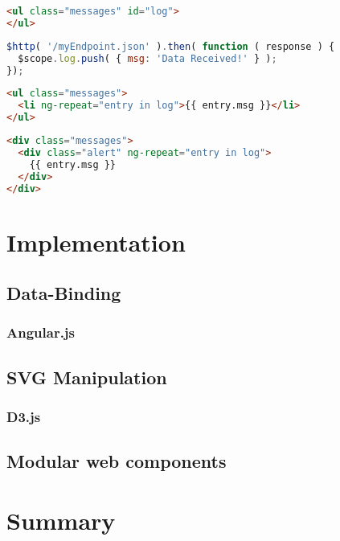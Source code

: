 \begin{lstlisting}[language=html]
<ul class="messages" id="log">
</ul>
\end{lstlisting}

\begin{lstlisting}[language=JavaScript]
$http( '/myEndpoint.json' ).then( function ( response ) {
  $scope.log.push( { msg: 'Data Received!' } );
});
\end{lstlisting}

\begin{lstlisting}[language=html]
<ul class="messages">
  <li ng-repeat="entry in log">{{ entry.msg }}</li>
</ul>
\end{lstlisting}

\begin{lstlisting}[language=html]
<div class="messages">
  <div class="alert" ng-repeat="entry in log">
    {{ entry.msg }}
  </div>
</div>
\end{lstlisting}

\section{Implementation}
\subsection{Data-Binding}
\subsubsection{Angular.js}
\subsection{SVG Manipulation}
\subsubsection{D3.js}
\subsection{Modular web components}

\section{Summary}
